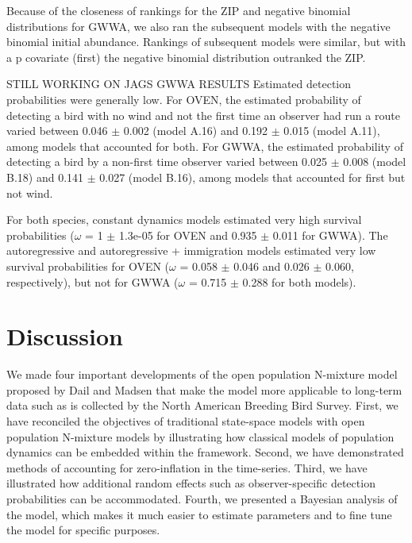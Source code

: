 \documentclass{article}
\begin{document}
Because of the closeness of rankings for the ZIP and negative binomial
distributions for GWWA, we also ran the subsequent models with the
negative binomial initial abundance.  Rankings of subsequent models
were similar, but with a p covariate (first) the negative binomial
distribution outranked the ZIP.

STILL WORKING ON JAGS GWWA RESULTS
Estimated detection probabilities were generally low.  For OVEN, the
estimated probability of detecting a bird with no wind and not the
first time an observer had run a route varied between 0.046 $\pm$ 0.002
(model A.16) and 0.192 $\pm$ 0.015 (model A.11), among models that
accounted for both.  For GWWA, the estimated probability of detecting
a bird by a non-first time observer varied between 0.025 $\pm$ 0.008
(model B.18) and 0.141 $\pm$ 0.027 (model B.16), among models that
accounted for first but not wind.

For both species, constant dynamics models estimated very high
survival probabilities ($\omega$ = 1 $\pm$ 1.3e-05 for OVEN and 0.935 $\pm$ 0.011 for
GWWA).   The autoregressive and autoregressive + immigration models
estimated very low survival probabilities for OVEN ($\omega$ = 0.058 $\pm$ 0.046
and 0.026 $\pm$ 0.060, respectively), but not for GWWA ($\omega$ = 0.715 $\pm$ 0.288
for both models).




\section{Discussion}



	We made four important developments of the open population
        N-mixture model proposed by Dail and Madsen that make the
        model more applicable to long-term data such as is collected
        by the North American Breeding Bird Survey. First, we have
        reconciled the objectives of traditional state-space models
        with open population N-mixture models by illustrating how
        classical models of population dynamics can be embedded within
        the framework. Second, we have demonstrated methods of
        accounting for zero-inflation in the time-series. Third, we
        have illustrated how additional random effects such as
        observer-specific detection probabilities can be
        accommodated. Fourth, we presented a Bayesian analysis of the
        model, which makes it much easier to estimate parameters and
        to fine tune the model for specific purposes.
\end{document}

